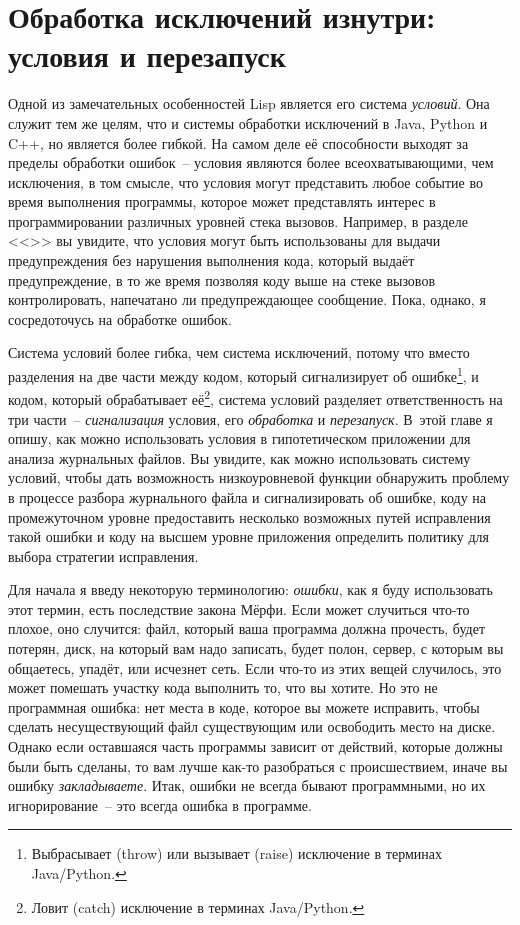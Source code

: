 \chapter{Обработка исключений изнутри: условия и перезапуск}
\label{ch:19}

\thispagestyle{empty}

Одной из замечательных особенностей Lisp является его система \textit{условий}. Она служит
тем же целям, что и системы обработки исключений в Java, Python и C++, но является более
гибкой. На самом деле её способности выходят за пределы обработки ошибок~-- условия
являются более всеохватывающими, чем исключения, в том смысле, что условия могут
представить любое событие во время выполнения программы, которое может представлять
интерес в программировании различных уровней стека вызовов. Например, в разделе
<<>> вы увидите, что условия могут быть использованы для выдачи
предупреждения без нарушения выполнения кода, который выдаёт предупреждение, в то же время
позволяя коду выше на стеке вызовов контролировать, напечатано ли предупреждающее
сообщение. Пока, однако, я сосредоточусь на обработке ошибок.

Система условий более гибка, чем система исключений, потому что вместо разделения на две
части между кодом, который сигнализирует об ошибке\footnote{Выбрасывает (throw) или
  вызывает (raise) исключение в терминах Java/Python.}, и кодом, который обрабатывает
её\footnote{Ловит (catch) исключение в терминах Java/Python.}, система условий разделяет
ответственность на три части~-- \textit{сигнализация} условия, его \textit{обработка} и
\textit{перезапуск}. В~этой главе я опишу, как можно использовать условия в гипотетическом
приложении для анализа журнальных файлов. Вы увидите, как можно использовать систему
условий, чтобы дать возможность низкоуровневой функции обнаружить проблему в процессе
разбора журнального файла и сигнализировать об ошибке, коду на промежуточном уровне
предоставить несколько возможных путей исправления такой ошибки и коду на высшем уровне
приложения определить политику для выбора стратегии исправления.

Для начала я введу некоторую терминологию: \textit{ошибки}, как я буду использовать этот
термин, есть последствие закона Мёрфи. Если может случиться что-то плохое, оно случится:
файл, который ваша программа должна прочесть, будет потерян, диск, на который вам надо
записать, будет полон, сервер, с которым вы общаетесь, упадёт, или исчезнет сеть. Если
что-то из этих вещей случилось, это может помешать участку кода выполнить то, что вы
хотите. Но это не программная ошибка: нет места в коде, которое вы можете исправить, чтобы
сделать несуществующий файл существующим или освободить место на диске. Однако если
оставшаяся часть программы зависит от действий, которые должны были быть сделаны, то вам
лучше как-то разобраться с происшествием, иначе вы ошибку \textit{закладываете}. Итак,
ошибки не всегда бывают программными, но их игнорирование~-- это всегда ошибка в
программе.

